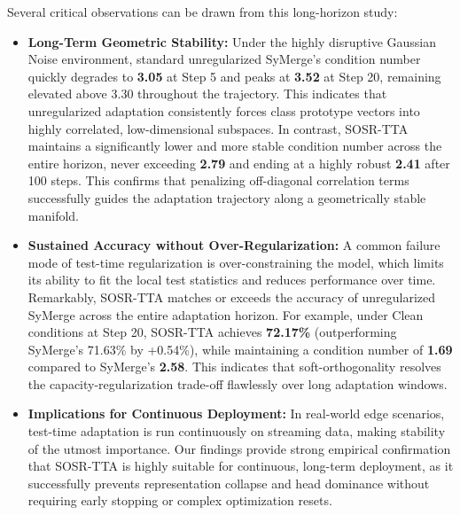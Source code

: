 \documentclass{article}
\theoremstyle{plain}
\theoremstyle{definition}
\theoremstyle{remark}
\begin{document}
Several critical observations can be drawn from this long-horizon study:
\begin{itemize}
  \item \textbf{Long-Term Geometric Stability:} Under the highly disruptive Gaussian Noise environment, standard unregularized SyMerge's condition number quickly degrades to \textbf{3.05} at Step 5 and peaks at \textbf{3.52} at Step 20, remaining elevated above 3.30 throughout the trajectory. This indicates that unregularized adaptation consistently forces class prototype vectors into highly correlated, low-dimensional subspaces. In contrast, SOSR-TTA maintains a significantly lower and more stable condition number across the entire horizon, never exceeding \textbf{2.79} and ending at a highly robust \textbf{2.41} after 100 steps. This confirms that penalizing off-diagonal correlation terms successfully guides the adaptation trajectory along a geometrically stable manifold.
  \item \textbf{Sustained Accuracy without Over-Regularization:} A common failure mode of test-time regularization is over-constraining the model, which limits its ability to fit the local test statistics and reduces performance over time. Remarkably, SOSR-TTA matches or exceeds the accuracy of unregularized SyMerge across the entire adaptation horizon. For example, under Clean conditions at Step 20, SOSR-TTA achieves \textbf{72.17\%} (outperforming SyMerge's 71.63\% by +0.54\%), while maintaining a condition number of \textbf{1.69} compared to SyMerge's \textbf{2.58}. This indicates that soft-orthogonality resolves the capacity-regularization trade-off flawlessly over long adaptation windows.
  \item \textbf{Implications for Continuous Deployment:} In real-world edge scenarios, test-time adaptation is run continuously on streaming data, making stability of the utmost importance. Our findings provide strong empirical confirmation that SOSR-TTA is highly suitable for continuous, long-term deployment, as it successfully prevents representation collapse and head dominance without requiring early stopping or complex optimization resets.
\end{itemize}
\end{document}
